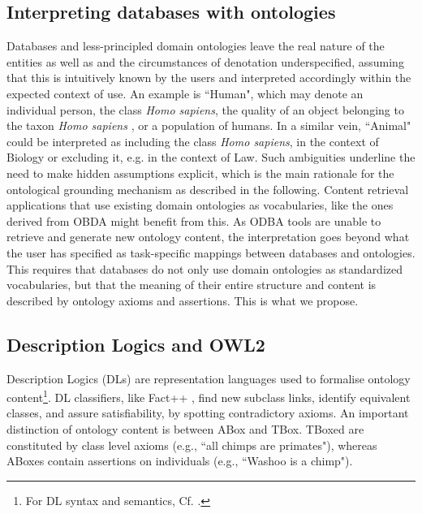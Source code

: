 \subsection*{Interpreting databases with ontologies}
Databases and less-principled domain ontologies leave the real nature of the entities as well as and the circumstances of denotation underspecified, assuming that this is intuitively known by the users and interpreted accordingly within the expected context of use. An example is ``Human", which may denote an individual person, the class \textit{Homo sapiens}, the quality of an object belonging to the taxon \textit{Homo sapiens} \citep{Schulz2008}, or a population of humans. In a similar vein, ``Animal" could be interpreted as including the class \textit{Homo sapiens}, in the context of Biology or excluding it, e.g. in the context of Law. Such ambiguities underline the need to make hidden assumptions explicit, which is the main rationale for the ontological grounding mechanism as described in the following. 
Content retrieval applications that use existing domain ontologies as vocabularies, like the ones derived from OBDA might benefit from this. As ODBA tools are unable to retrieve and generate new ontology content, the interpretation goes beyond what the user has specified as task-specific mappings between databases and ontologies. This requires that databases do not only use domain ontologies as standardized vocabularies, but that the meaning of their entire structure and content is described by ontology axioms and assertions. This is what we propose.

\subsection*{Description Logics and OWL2}

Description Logics (DLs) are representation languages used to formalise ontology content\footnote{For DL syntax and semantics, Cf. \cite{Baader2007g}.}. DL classifiers, like Fact++ \citep{Tsarkov2006}, find new subclass links, identify equivalent classes, and assure satisfiability, by spotting contradictory axioms. An important distinction of ontology content is between ABox and TBox. TBoxed are constituted by class level axioms (e.g., ``all chimps are primates"),  whereas ABoxes contain assertions on individuals (e.g., ``Washoo is a chimp").

